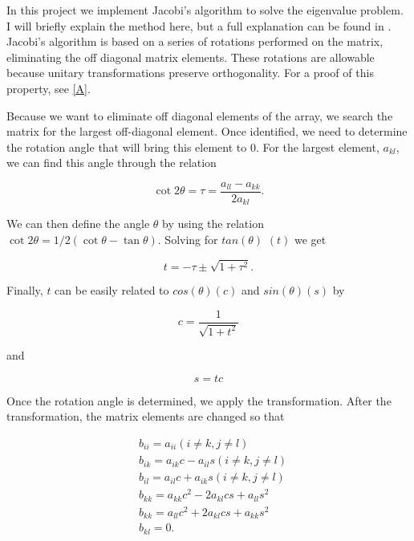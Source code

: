 \documentclass[%
oneside,                 %
final,                   %
10pt]{article}
\begin{document}
In this project we implement Jacobi's algorithm to solve the eigenvalue problem.  I will briefly explain the method here, but a full explanation can be found in \cite{LectureNotes}.  Jacobi's algorithm is based on a series of rotations performed on the matrix, eliminating the off diagonal matrix elements.  These rotations are allowable because unitary transformations preserve orthogonality.  For a proof of this property, see \ref{A}.

Because we want to eliminate off diagonal elements of the array, we search the matrix for the largest off-diagonal element.  Once identified, we need to determine the rotation angle that will bring this element to 0.  For the largest element, $a_{kl}$, we can find this angle through the relation

\begin{equation*}
\cot 2\theta=\tau = \frac{a_{ll}-a_{kk}}{2a_{kl}}.
\end{equation*}

We can then define the angle $\theta$ by using the relation $\cot 2\theta=1/2(\cot \theta-\tan\theta)$.  Solving for $tan(\theta)$ $(t)$ we get

\begin{equation*}
  t = -\tau \pm \sqrt{1+\tau^2}.
\end{equation*}

Finally, $t$ can be easily related to $cos(\theta) (c)$ and $sin(\theta) (s)$ by

\begin{equation*}
   c = \frac{1}{\sqrt{1+t^2}}
\end{equation*}

and

\begin{equation*} 
s=tc
\end{equation*}

Once the rotation angle is determined, we apply the transformation.  After the transformation, the matrix elements are changed so that

\begin{equation*}
\begin{split}
& b_{ii}=a_{ii} (i \ne k, j \ne l) \\
& b_{ik}=a_{ik}c - a_{il}s  (i \ne k, j \ne l) \\
& b_{il}=a_{il}c + a_{ik}s  (i \ne k, j \ne l) \\
& b_{kk}=a_{kk}c^2 -2a_{kl}cs + a_{ll}s^2 \\
& b_{kk}=a_{ll}c^2 +2a_{kl}cs + a_{kk}s^2 \\
& b_{kl} = 0.
\end{split}
\end{equation*}
\end{document}
